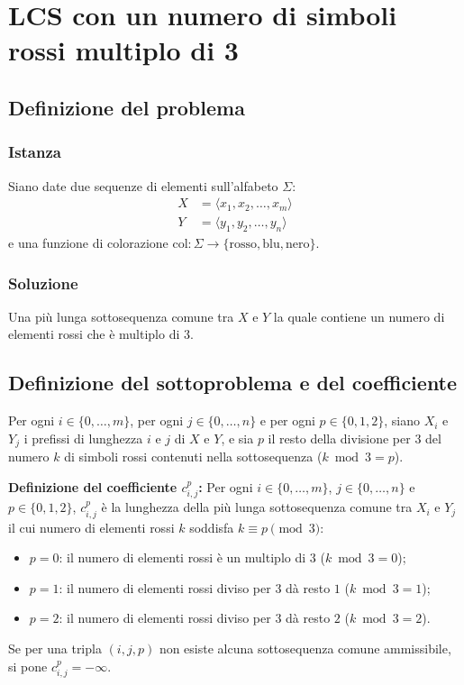 \chapter{LCS con un numero di simboli rossi multiplo di 3}

\section{Definizione del problema}

\subsection{Istanza}
Siano date due sequenze di elementi sull'alfabeto $\Sigma$:
\begin{align*}
    X &= \langle x_1, x_2, \dots, x_m \rangle \\
    Y &= \langle y_1, y_2, \dots, y_n \rangle
\end{align*}
e una funzione di colorazione $\text{col} : \Sigma \to \{\text{rosso}, \text{blu}, \text{nero}\}$.

\subsection{Soluzione}
Una più lunga sottosequenza comune tra $X$ e $Y$ la quale contiene un numero di elementi rossi che è multiplo di $3$.

\section{Definizione del sottoproblema e del coefficiente}
Per ogni $i \in \{0, \dots, m\}$, per ogni $j \in \{0, \dots, n\}$ e per ogni $p \in \{0, 1, 2\}$, siano $X_i$ e $Y_j$ i prefissi di lunghezza $i$ e $j$ di $X$ e $Y$, e sia $p$ il resto della divisione per $3$ del numero $k$ di simboli rossi contenuti nella sottosequenza ($k \bmod 3 = p$).

\medskip
\noindent
\textbf{Definizione del coefficiente $c_{i,j}^p$:} Per ogni $i \in \{0, \dots, m\}$, $j \in \{0, \dots, n\}$ e $p \in \{0, 1, 2\}$, $c_{i,j}^p$ è la lunghezza della più lunga sottosequenza comune tra $X_i$ e $Y_j$ il cui numero di elementi rossi $k$ soddisfa $k \equiv p \pmod 3$:
\begin{itemize}
    \item $p = 0$: il numero di elementi rossi è un multiplo di $3$ ($k \bmod 3 = 0$);
    \item $p = 1$: il numero di elementi rossi diviso per $3$ dà resto $1$ ($k \bmod 3 = 1$);
    \item $p = 2$: il numero di elementi rossi diviso per $3$ dà resto $2$ ($k \bmod 3 = 2$).
\end{itemize}
Se per una tripla $(i, j, p)$ non esiste alcuna sottosequenza comune ammissibile, si pone $c_{i,j}^p = -\infty$.


